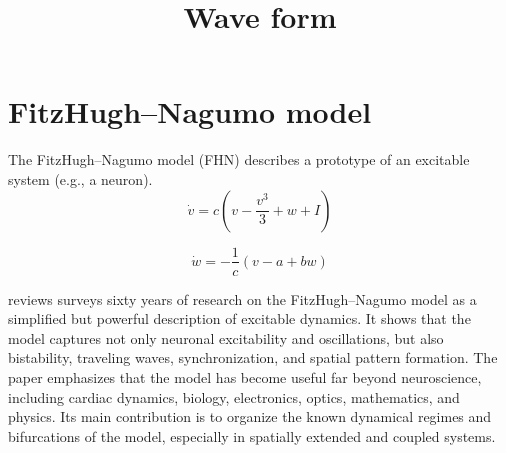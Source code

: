 \documentclass[a4paper]{article}
\title{Wave form}
\date{}
\begin{document}
    \maketitle
    
    
    \section{FitzHugh–Nagumo model}
        
        The FitzHugh–Nagumo model (FHN) describes a prototype of an excitable system (e.g., a neuron).
        \[
            \dot{v} = c\left(v - \frac{v^{3}}{3} + w + I\right)
        \]
        
        \[
            \dot{w} = -\frac{1}{c}\left(v - a + bw\right)
        \]
        
        \cite{cebrian-lacasa-2025-six-decades-of-the-fitzhugh-nagumo-model-a-guide-through-its-spatio-temporal-dynamics-and-influence-across-disciplines} reviews  surveys sixty years of research on the FitzHugh–Nagumo model as a simplified but powerful description of excitable dynamics.
        It shows that the model captures not only neuronal excitability and oscillations, but also bistability, traveling waves, synchronization, and spatial pattern formation.
        The paper emphasizes that the model has become useful far beyond neuroscience, including cardiac dynamics, biology, electronics, optics, mathematics, and physics.
        Its main contribution is to organize the known dynamical regimes and bifurcations of the model, especially in spatially extended and coupled systems.
        
        
\end{document}
